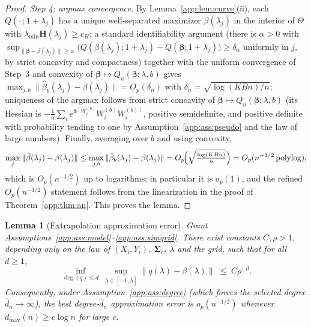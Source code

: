 \documentclass[11pt]{article}
\theoremstyle{plain}
\newtheorem{lemma}{Lemma}
\theoremstyle{definition}
\newcommand{\bet}{\bm{\beta}}
\newcommand{\bSig}{\bm{\Sigma}}
\begin{document}
\begin{proof}
\emph{Step 4: argmax convergence.} By Lemma~\ref{app:lem:curve}(ii), each
$Q(\cdot\,;1+\lambda_j)$ has a unique well-separated maximizer
$\beta(\lambda_j)$ in the interior of $\Theta$ with
$\lambda_{\min}\bm H(\lambda_j)\ge c_H$; a standard identifiability
argument (there is $\alpha>0$ with
$\sup_{\|\bet-\beta(\lambda_j)\|\ge\alpha}
\bigl(Q(\beta(\lambda_j);1+\lambda_j)-Q(\bet;1+\lambda_j)\bigr)\ge\delta_\alpha$
uniformly in $j$, by strict concavity and compactness) together with the
uniform convergence of Step~3 and convexity of
$\bet\mapsto Q_n(\bet;\lambda,b)$ gives
$\max_{j,b}\|\hat\beta_b(\lambda_j)-\beta(\lambda_j)\|
=O_p(\delta_n)$ with $\delta_n=\sqrt{\log(KBn)/n}$; uniqueness of the
argmax follows from strict concavity of
$\bet\mapsto Q_n(\bet;\lambda,b)$ (its Hessian is
$-\frac1n\sum_i e^{\bet^\top W_i^{(b)}}W_i^{(b)}W_i^{(b)\top}$, positive
semidefinite, and positive definite with probability tending to one by
Assumption~\ref{app:ass:pseudo} and the law of large numbers). Finally,
averaging over $b$ and using convexity,
\[
  \max_{j}\|\bar\beta(\lambda_j)-\beta(\lambda_j)\|
  \le \max_{j,b}\|\hat\beta_b(\lambda_j)-\beta(\lambda_j)\|
  =O_p\!\Bigl(\sqrt{\tfrac{\log(KBn)}{n}}\Bigr)=O_p(n^{-1/2}\,\mathrm{polylog}),
\]
which is $O_p(n^{-1/2})$ up to logarithms; in particular it is
$o_p(1)$, and the refined $O_p(n^{-1/2})$ statement follows from the
linearization in the proof of Theorem~\ref{app:thm:an}. This proves the
lemma.
\end{proof}

\begin{lemma}[Extrapolation approximation error]\label{app:lem:approx}
Grant Assumptions~\ref{app:ass:model}--\ref{app:ass:simgrid}. There exist
constants $C,\rho>1$, depending only on the law of $(X_i,Y_i)$,
$\bSig_\epsilon$, $\bar\lambda$ and the grid, such that for all $d\ge 1$,
\[
  \inf_{\deg(q)\le d}\ \sup_{\lambda\in[-1,\bar\lambda]}
  \bigl\|q(\lambda)-\beta(\lambda)\bigr\|
  \;\le\; C\rho^{-d}.
\]
Consequently, under Assumption~\ref{app:ass:degree} (which forces the selected
degree $\hat d_n\to\infty$), the best degree-$\hat d_n$ approximation
error is $o_p(n^{-1/2})$ whenever $d_{\max}(n)\ge c\log n$ for large $c$.
\end{lemma}
\end{document}
